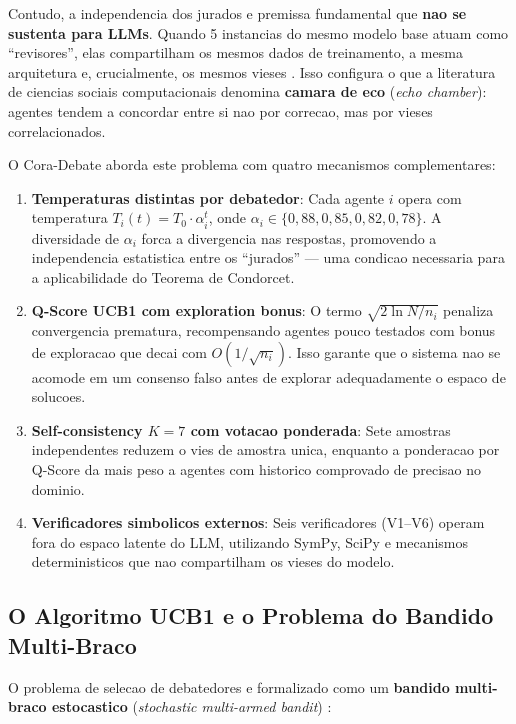 \documentclass[5p]{elsarticle}
\begin{document}
Contudo, a independencia dos jurados e premissa fundamental que \textbf{nao se sustenta para LLMs}. Quando 5 instancias do mesmo modelo base atuam como ``revisores'', elas compartilham os mesmos dados de treinamento, a mesma arquitetura e, crucialmente, os mesmos vieses \cite{guo2017}. Isso configura o que a literatura de ciencias sociais computacionais denomina \textbf{camara de eco} (\textit{echo chamber}): agentes tendem a concordar entre si nao por correcao, mas por vieses correlacionados.

O Cora-Debate aborda este problema com quatro mecanismos complementares:

\begin{enumerate}[label=(\roman*)]
  \item \textbf{Temperaturas distintas por debatedor}: Cada agente $i$ opera com temperatura $T_i(t) = T_0 \cdot \alpha_i^t$, onde $\alpha_i \in \{0,88, 0,85, 0,82, 0,78\}$. A diversidade de $\alpha_i$ forca a divergencia nas respostas, promovendo a independencia estatistica entre os ``jurados'' --- uma condicao necessaria para a aplicabilidade do Teorema de Condorcet.

  \item \textbf{Q-Score UCB1 com exploration bonus}: O termo $\sqrt{2\ln N / n_i}$ penaliza convergencia prematura, recompensando agentes pouco testados com bonus de exploracao que decai com $O(1/\sqrt{n_i})$. Isso garante que o sistema nao se acomode em um consenso falso antes de explorar adequadamente o espaco de solucoes.

  \item \textbf{Self-consistency $K=7$ com votacao ponderada}: Sete amostras independentes reduzem o vies de amostra unica, enquanto a ponderacao por Q-Score da mais peso a agentes com historico comprovado de precisao no dominio.

  \item \textbf{Verificadores simbolicos externos}: Seis verificadores (V1--V6) operam fora do espaco latente do LLM, utilizando SymPy, SciPy e mecanismos deterministicos que nao compartilham os vieses do modelo.
\end{enumerate}

\subsection{O Algoritmo UCB1 e o Problema do Bandido Multi-Braco}

O problema de selecao de debatedores e formalizado como um \textbf{bandido multi-braco estocastico} (\textit{stochastic multi-armed bandit}) \cite{auer2002,lai1985}:
\end{document}

